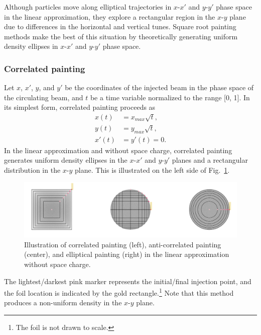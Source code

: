Although particles move along elliptical trajectories in $x$-$x'$ and $y$-$y'$ phase space in the linear approximation, they explore a rectangular region in the $x$-$y$ plane due to differences in the horizontal and vertical tunes. Square root painting methods make the best of this situation by theoretically generating uniform density ellipses in $x$-$x'$ and $y$-$y'$ phase space. 

\subsubsection{Correlated painting}

Let $x$, $x'$, $y$, and $y'$ be the coordinates of the injected beam in the phase space of the circulating beam, and $t$ be a time variable normalized to the range [0, 1]. In its simplest form, correlated painting proceeds as
%
\begin{equation}
\begin{aligned}
    {x}(t) &= {x}_{max}\sqrt{t}, \\
    {y}(t) &= {y}_{max}\sqrt{t}, \\
    x'(t) &= y'(t) = 0.
\end{aligned}
\end{equation}
%
In the linear approximation and without space charge, correlated painting generates uniform density ellipses in the $x$-$x'$ and $y$-$y'$ planes and a rectangular distribution in the $x$-$y$ plane. This is illustrated on the left side of Fig.~\ref{fig:painting_graphic}. 
%
\begin{figure}[!p]
    \centering
    \includegraphics[width=\textwidth]{Images/chapter1/painting_graphic.png}
    \caption{Illustration of correlated painting (left), anti-correlated painting (center), and elliptical painting (right) in the linear approximation without space charge.}
    \label{fig:painting_graphic}
\end{figure}
%
The lightest/darkest pink marker represents the initial/final injection point, and the foil location is indicated by the gold rectangle.\footnote{The foil is not drawn to scale.} Note that this method produces a non-uniform density in the $x$-$y$ plane.


